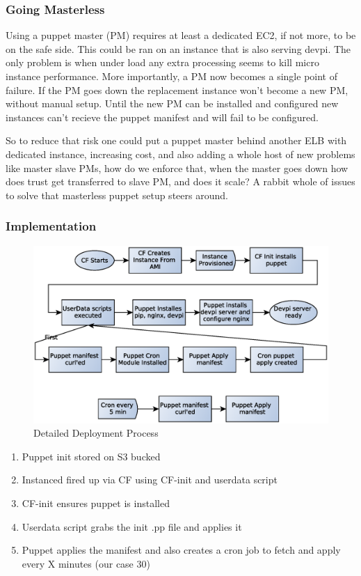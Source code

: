 \documentclass[12pt, letterpaper]{article}
\begin{document}
\subsubsection{Going Masterless}

Using a puppet master (PM) requires at least a dedicated EC2, if not more, to be on the safe side. This could be ran on an instance
that is also serving devpi. The only problem is when under load any extra processing seems to kill micro instance performance.
More importantly, a PM now becomes a single point of failure. If the PM goes down the replacement instance won't become a new PM,
without manual setup. Until the new PM can be installed and configured new instances can't recieve the puppet manifest and will fail
to be configured. 

So to reduce that risk one could put a puppet master behind another ELB with dedicated instance, increasing cost, and also adding 
a whole host of new problems like master slave PMs, how do we enforce that, when the master goes down how does trust get 
transferred to slave PM, and does it scale? A rabbit whole of issues to solve that masterless puppet setup steers around.

\subsubsection{Implementation}

\begin{figure}[h]
    \caption{Detailed Deployment Process}
    \centering
    \includegraphics[width=\textwidth]{figures/base_setup.eps}
\end{figure}
\begin{enumerate}
    \item Puppet init stored on S3 bucked
    \item Instanced fired up via CF using CF-init and userdata script
    \item CF-init ensures puppet is installed
    \item Userdata script grabs the init .pp file and applies it
    \item Puppet applies the manifest and also creates a cron job to fetch and apply every X minutes (our case 30) 
\end{enumerate}
\end{document}
